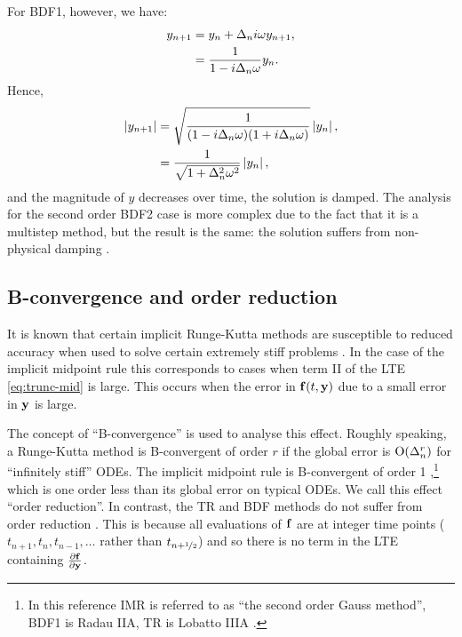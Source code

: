 For BDF1, however, we have:
\begin{equation}
  \begin{aligned}
    y_{n+1} &= y_n + \Delta_{n} i \omega y_{n+1}, \\
    &= \frac{1}{1 - i \Delta_{n} \omega} y_n.
  \end{aligned}
\end{equation}
Hence,
\begin{equation}
  \begin{aligned}
    \left|{y_{n+1}} \right| &= \sqrt{ \frac{1}{(1 - i \Delta_{n} \omega)(1 + i \Delta_{n} \omega)}} \left|{y_n} \right|, \\
    &= \frac{1}{\sqrt{1 + \Delta_{n}^2 \omega^2}} \left|{y_n} \right|, \\
  \end{aligned}
\end{equation}
and the magnitude of $y$ decreases over time, \ie the solution is damped.
The analysis for the second order BDF2 case is more complex due to the fact that it is a multistep method, but the result is the same: the solution suffers from non-physical damping \cite[265]{GreshoSani}.


\subsection{B-convergence and order reduction}
\label{sec:order-reduction}

It is known that certain implicit Runge-Kutta methods are susceptible to reduced accuracy when used to solve certain extremely stiff problems \cite[156]{Atkinson1994} \cite[225]{HairerWanner}.
In the case of the implicit midpoint rule this corresponds to cases when term II of the LTE \cref{eq:trunc-mid} is large.
This occurs when the error in ${\boldsymbol{\mathrm{f}}{\left( t, \boldsymbol{\mathrm{y}} \right)}}$ due to a small error in $\boldsymbol{\mathrm{y}}$ is large.

The concept of ``B-convergence'' is used to analyse this effect.
Roughly speaking, a Runge-Kutta method is B-convergent of order $r$ if the global error is $\mathrm{O}{\left( \Delta_{n}^r \right)}$ for ``infinitely stiff'' ODEs.
The implicit midpoint rule is B-convergent of order 1 \cite[231]{HairerWanner},\footnote{In this reference IMR is referred to as ``the second order Gauss method'', BDF1 is Radau IIA, TR is Lobatto IIIA \cite[72-76]{HairerWanner}.} which is one order less than its global error on typical ODEs.
We call this effect ``order reduction''.
In contrast, the TR and BDF methods do not suffer from order reduction \cite[159]{Atkinson1994}.
This is because all evaluations of ${\boldsymbol{\mathrm{f}}}$ are at integer time points (\ie $t_{n+1}, t_{n}, t_{n-1}, \ldots$ rather than $t_{n+\nicefrac{1}{2}}$) and so there is no term in the LTE containing $\frac{\partial {\boldsymbol{\mathrm{f}}}}{\partial \boldsymbol{\mathrm{y}}}$.

